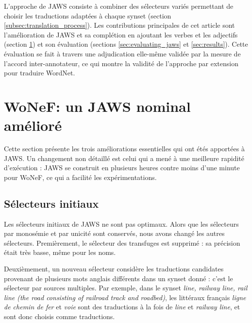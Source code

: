 L'approche de JAWS consiste à combiner des sélecteurs variés permettant de
choisir les traductions adaptées à chaque synset (section
\ref{subsec:translation_process}). Les contributions principales de cet article
sont l'amélioration de JAWS et sa complétion en ajoutant les verbes et les
adjectifs (section \ref{sec:improving_jaws}) et son évaluation (sections
\ref{sec:evaluating_jaws} et \ref{sec:results}). Cette évaluation se fait à
travers une adjudication elle-même validée par la mesure de l'accord
inter-annotateur, ce qui montre la validité de l'approche par extension pour
traduire WordNet.

\section{WoNeF: un JAWS nominal amélioré}
\label{sec:improving_jaws}

Cette section présente les trois améliorations essentielles qui ont étés
apportées à JAWS. Un changement non détaillé est celui qui a mené à une
meilleure rapidité d'exécution : JAWS se construit en plusieurs heures contre
moins d'une minute pour WoNeF, ce qui a facilité les expérimentations.

\subsection{Sélecteurs initiaux}
\label{subsec:revisiting_extraction_heuristics}


Les sélecteurs initiaux de JAWS ne sont pas optimaux. Alors que les sélecteurs
par monosémie et par unicité sont conservés, nous avons changé les autres
sélecteurs. Premièrement, le sélecteur des transfuges est supprimé : sa
précision était très basse, même pour les noms.

Deuxièmement, un nouveau sélecteur considère les traductions candidates
provenant de plusieurs mots anglais différents dans un synset donné : c'est le
sélecteur par sources multiples. Par exemple, dans le synset \textit{line,
railway line, rail line (the road consisting of railroad track and roadbed)},
les littéraux français \textit{ligne de chemin de fer} et \textit{voie} sont
des traductions à la fois de \textit{line} et \textit{railway line}, et sont
donc choisis comme traductions.

